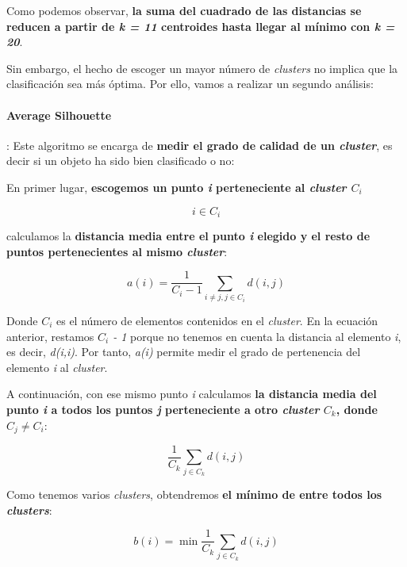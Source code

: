 \documentclass [a4paper] {article}
\begin{document}
\newpage
Como podemos observar, \textbf{la suma del cuadrado de las distancias se reducen a partir de \textit{k = 11} centroides hasta llegar al mínimo con \textit{k = 20}}.

Sin embargo, el hecho de escoger un mayor número de \textit{clusters} no implica que la clasificación sea más óptima. Por ello, vamos a realizar un segundo análisis:

\paragraph{Average Silhouette}:
Este algoritmo se encarga de \textbf{medir el grado de calidad de un \textit{cluster}}, es decir si un objeto ha sido bien clasificado o no:

En primer lugar, \textbf{escogemos un punto \textit{i} perteneciente al \textit{cluster $C_i$}}

\begin{equation*}
i \in C_i
\end{equation*}

calculamos la \textbf{distancia media entre el punto \textit{i} elegido y el resto de puntos pertenecientes al mismo \textit{cluster}}:

\begin{equation*}
a(i) = \frac{1}{C_i-1}\sum_{i\neq j , j \in C_i}^{}d(i,j)
\end{equation*}

Donde $C_i$ es el número de elementos contenidos en el \textit{cluster}. En la ecuación anterior, restamos \textit{$C_i$ - 1} porque no tenemos en cuenta la distancia al elemento \textit{i}, es decir, \textit{d(i,i)}. Por tanto, \textit{a(i)} permite medir el grado de pertenencia del elemento \textit{i} al \textit{cluster}.

A continuación, con ese mismo punto \textit{i} calculamos \textbf{la distancia media del punto \textit{i} a todos los puntos \textit{j} perteneciente a otro \textit{cluster} $C_k$, donde $C_j \neq C_i$}:

\begin{equation*}
\frac{1}{C_k}\sum_{j \in C_k}^{}d(i,j)
\end{equation*}

Como tenemos varios \textit{clusters}, obtendremos \textbf{el mínimo de entre todos los \textit{clusters}}:

\begin{equation*}
b(i) = \min \frac{1}{C_k}\sum_{j \in C_k}^{}d(i,j)
\end{equation*}
\end{document}
